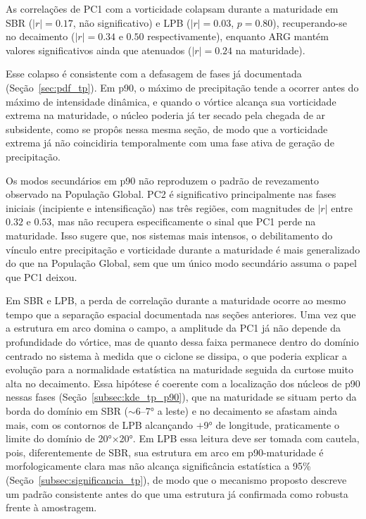 As correlações de PC1 com a vorticidade colapsam durante a maturidade em SBR ($|r|=0.17$, não significativo) e LPB ($|r|=0.03$, $p = 0.80$), recuperando-se no decaimento ($|r|=0.34$ e $0.50$ respectivamente), enquanto ARG mantém valores significativos ainda que atenuados ($|r|=0.24$ na maturidade).

Esse colapso é consistente com a defasagem de fases já documentada (Seção~\ref{sec:pdf_tp}). Em p90, o máximo de precipitação tende a ocorrer antes do máximo de intensidade dinâmica, e quando o vórtice alcança sua vorticidade extrema na maturidade, o núcleo poderia já ter secado pela chegada de ar subsidente, como se propôs nessa mesma seção, de modo que a vorticidade extrema já não coincidiria temporalmente com uma fase ativa de geração de precipitação.

Os modos secundários em p90 não reproduzem o padrão de revezamento observado na População Global. PC2 é significativo principalmente nas fases iniciais (incipiente e intensificação) nas três regiões, com magnitudes de $|r|$ entre $0.32$ e $0.53$, mas não recupera especificamente o sinal que PC1 perde na maturidade. Isso sugere que, nos sistemas mais intensos, o debilitamento do vínculo entre precipitação e vorticidade durante a maturidade é mais generalizado do que na População Global, sem que um único modo secundário assuma o papel que PC1 deixou.

Em SBR e LPB, a perda de correlação durante a maturidade ocorre ao mesmo tempo que a separação espacial documentada nas seções anteriores. Uma vez que a estrutura em arco domina o campo, a amplitude da PC1 já não depende da profundidade do vórtice, mas de quanto dessa faixa permanece dentro do domínio centrado no sistema à medida que o ciclone se dissipa, o que poderia explicar a evolução para a normalidade estatística na maturidade seguida da curtose muito alta no decaimento. Essa hipótese é coerente com a localização dos núcleos de p90 nessas fases (Seção~\ref{subsec:kde_tp_p90}), que na maturidade se situam perto da borda do domínio em SBR (${\sim}$6--7° a leste) e no decaimento se afastam ainda mais, com os contornos de LPB alcançando $+$9° de longitude, praticamente o limite do domínio de 20°×20°. Em LPB essa leitura deve ser tomada com cautela, pois, diferentemente de SBR, sua estrutura em arco em p90-maturidade é morfologicamente clara mas não alcança significância estatística a 95\% (Seção~\ref{subsec:significancia_tp}), de modo que o mecanismo proposto descreve um padrão consistente antes do que uma estrutura já confirmada como robusta frente à amostragem.

